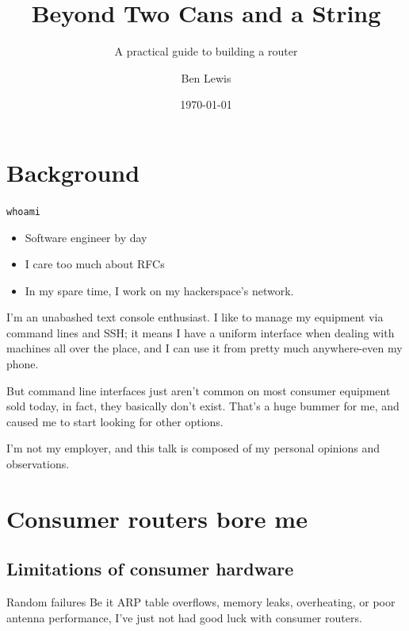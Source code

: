 \documentclass[bigger,aspectratio=169]{beamer}
\author{Ben Lewis}
\date{\today}
\title{Beyond Two Cans and a String}
\subtitle{A practical guide to building a router}
\begin{document}
\maketitle

\section{Background}
\label{sec:orgb37081c}

\begin{frame}[fragile,label={sec:org06c16c6}]{\texttt{whoami}}
  \begin{itemize}
  \item Software engineer by day
  \item I care too much about RFCs
  \item In my spare time, I work on my hackerspace's network.
  \end{itemize}
\begin{notes}
I'm an unabashed text console enthusiast. I like to manage my equipment via
command lines and SSH; it means I have a uniform interface when dealing with
machines all over the place, and I can use it from pretty much anywhere-even my
phone.

But command line interfaces just aren't common on most consumer equipment sold
today, in fact, they basically don't exist. That's a huge bummer for me, and
caused me to start looking for other options.
\end{notes}
\end{frame}

\begin{frame}
  I'm not my employer, and this talk is composed of my personal opinions and observations.
\end{frame}

\section{Consumer routers bore me}
\label{sec:org769d52d}

\frame{\sectionpage}

\subsection{Limitations of consumer hardware}
\label{sec:orgbbeeef6}

\begin{frame}[label={sec:org6db040a}]{Random failures}
Be it ARP table overflows, memory leaks, overheating, or poor antenna
performance, I've just not had good luck with consumer routers.
\end{frame}
\end{document}
